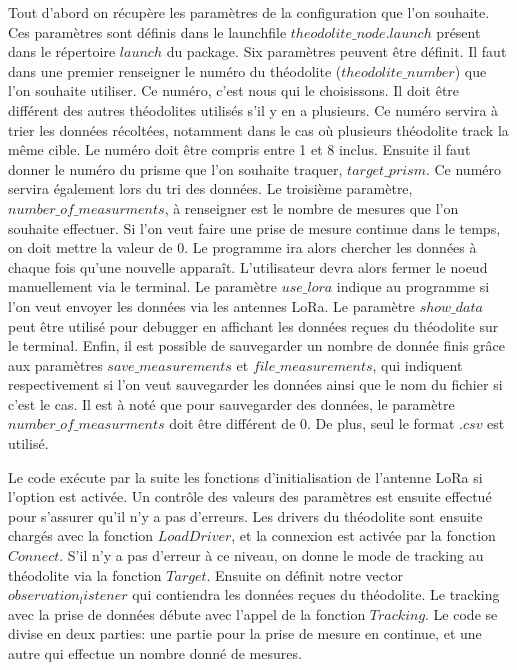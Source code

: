 \documentclass[10pt,letterpaper,oneside]{article}
\begin{document}
Tout d'abord on récupère les paramètres de la configuration que l'on souhaite.
Ces paramètres sont définis dans le launchfile $theodolite\_node.launch$ présent dans le répertoire $launch$ du package.
Six paramètres peuvent être définit.
Il faut dans une premier renseigner le numéro du théodolite ($theodolite\_number$) que l'on souhaite utiliser.
Ce numéro, c'est nous qui le choisissons.
Il doit être différent des autres théodolites utilisés s'il y en a plusieurs.
Ce numéro servira à trier les données récoltées, notamment dans le cas où plusieurs théodolite track la même cible.
Le numéro doit être compris entre 1 et 8 inclus.
Ensuite il faut donner le numéro du prisme que l'on souhaite traquer, $target\_prism$.
Ce numéro servira également lors du tri des données.
Le troisième paramètre, $number\_of\_measurments$, à renseigner est le nombre de mesures que l'on souhaite effectuer.
Si l'on veut faire une prise de mesure continue dans le temps, on doit mettre la valeur de 0.
Le programme ira alors chercher les données à chaque fois qu'une nouvelle apparaît.
L'utilisateur devra alors fermer le noeud manuellement via le terminal.
Le paramètre $use\_lora$ indique au programme si l'on veut envoyer les données via les antennes LoRa.
Le paramètre $show\_data$ peut être utilisé pour debugger en affichant les données reçues du théodolite sur le terminal.
Enfin, il est possible de sauvegarder un nombre de donnée finis grâce aux paramètres $save\_measurements$ et $file\_measurements$, qui indiquent respectivement si l'on veut sauvegarder les données ainsi que le nom du fichier si c'est le cas.
Il est à noté que pour sauvegarder des données, le paramètre $number\_of\_measurments$ doit être différent de 0.
De plus, seul le format $.csv$ est utilisé.

Le code exécute par la suite les fonctions d'initialisation de l'antenne LoRa si l'option est activée.
Un contrôle des valeurs des paramètres est ensuite effectué pour s'assurer qu'il n'y a pas d'erreurs.
Les drivers du théodolite sont ensuite chargés avec la fonction $LoadDriver$, et la connexion est activée par la fonction $Connect$.
S'il n'y a pas d'erreur à ce niveau, on donne le mode de tracking au théodolite via la fonction $Target$.
Ensuite on définit notre vector $observation_listener$ qui contiendra les données reçues du théodolite.
Le tracking avec la prise de données débute avec l'appel de la fonction $Tracking$.
Le code se divise en deux parties: une partie pour la prise de mesure en continue, et une autre qui effectue un nombre donné de mesures.
\end{document}
